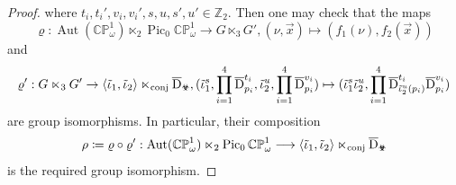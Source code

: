 \documentclass[11pt,a4paper,reqno]{amsart}%
\theoremstyle{plain}
\theoremstyle{definition}
\numberwithin{equation}{section}
\numberwithin{equation}{section}
\def\ZZ{\mathbb{Z}}
\newcommand{\vx}{\vec{x}}
\newcommand{\Pic}{\operatorname{Pic}\nolimits}
\def\wt{\omega}
\def\Aut{\operatorname{Aut}}
\def\CPone{\mathbb{CP}^1_{\wt}}
\def\vot{\text{\Biohazard}}
\begin{document}
\begin{proof}
where $t_i,t_i',v_i,v_i', {s},{u}, {s'}, {u'}\in \ZZ_2$. 
Then one may check that the maps
\[
\varrho:\Aut(\CPone) \ltimes_2 \Pic_0\CPone\to G\ltimes_3G',(\nu,\vx)\mapsto(f_1(\nu),f_2(\vx))
\]
and
\[
\varrho':G\ltimes_3G'\to \langle\tilde\iota_1,\tilde\iota_2\rangle \ltimes_{\rm conj} \overline{\mathrm{D}}_{\vot}, (\tilde\iota_1^{s},\prod_{i=1}^4 \overline{\mathrm{D}}_{p_i}^{t_i},\tilde\iota_2^{u},\prod_{i=1}^4 \overline{\mathrm{D}}_{p_i}^{v_i})\mapsto (\tilde\iota_1^{s}\tilde\iota_2^{u}, \prod_{i=1}^4 \overline{\mathrm{D}}_{\tilde\iota_2^{u}(p_i)}^{t_i}\overline{\mathrm{D}}_{p_i}^{v_i}  )
\] 
are group isomorphisms.  In particular, their composition
\begin{equation}\label{eq:rho-normal-subgroup}
\rho\coloneqq  \varrho \circ \varrho':
\Aut(\CPone)\ltimes_2\Pic_0\CPone
\longrightarrow
\langle\tilde\iota_1,\tilde\iota_2\rangle\ltimes_{\rm conj}
\overline{\mathrm{D}}_{\vot}
\end{equation}
is the required group isomorphism.
\end{proof}
 
  
 
\end{document}
